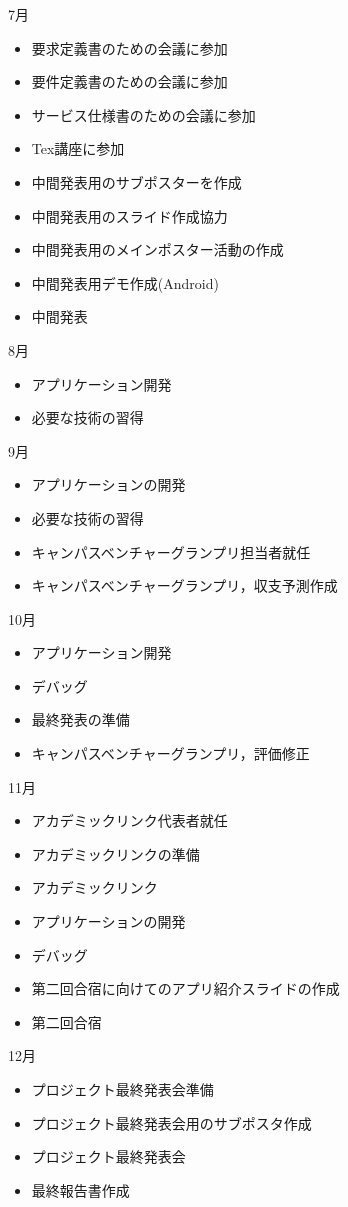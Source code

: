 7月
\begin{itemize}
\item 要求定義書のための会議に参加
\item 要件定義書のための会議に参加
\item サービス仕様書のための会議に参加
\item Tex講座に参加
\item 中間発表用のサブポスターを作成
\item 中間発表用のスライド作成協力
\item 中間発表用のメインポスター活動の作成
\item 中間発表用デモ作成(Android)
\item 中間発表
\end{itemize}
8月
\begin{itemize}
\item アプリケーション開発
\item 必要な技術の習得
\end{itemize}
9月
\begin{itemize}
\item アプリケーションの開発
\item 必要な技術の習得
\item キャンパスベンチャーグランプリ担当者就任
\item キャンパスベンチャーグランプリ，収支予測作成
\end{itemize}
10月
\begin{itemize}
\item アプリケーション開発
\item デバッグ
\item 最終発表の準備
\item キャンパスベンチャーグランプリ，評価修正
\end{itemize}
11月
\begin{itemize}
\item アカデミックリンク代表者就任
\item アカデミックリンクの準備
\item アカデミックリンク
\item アプリケーションの開発
\item デバッグ
\item 第二回合宿に向けてのアプリ紹介スライドの作成
\item 第二回合宿
\end{itemize}
12月
\begin{itemize}
\item プロジェクト最終発表会準備
\item プロジェクト最終発表会用のサブポスタ作成
\item プロジェクト最終発表会
\item 最終報告書作成
\end{itemize}
